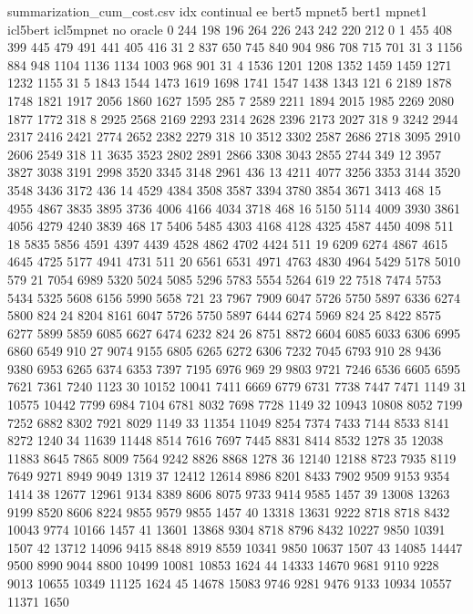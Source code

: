 

\begin{filecontents*}{summarization_cum_cost.csv}
idx	continual	ee	bert5	mpnet5	bert1	mpnet1	icl5bert	icl5mpnet	no	oracle
0	244	198	196	264	226	243	242	220	212	0
1	455	408	399	445	479	491	441	405	416	31
2	837	650	745	840	904	986	708	715	701	31
3	1156	884	948	1104	1136	1134	1003	968	901	31
4	1536	1201	1208	1352	1459	1459	1271	1232	1155	31
5	1843	1544	1473	1619	1698	1741	1547	1438	1343	121
6	2189	1878	1748	1821	1917	2056	1860	1627	1595	285
7	2589	2211	1894	2015	1985	2269	2080	1877	1772	318
8	2925	2568	2169	2293	2314	2628	2396	2173	2027	318
9	3242	2944	2317	2416	2421	2774	2652	2382	2279	318
10	3512	3302	2587	2686	2718	3095	2910	2606	2549	318
11	3635	3523	2802	2891	2866	3308	3043	2855	2744	349
12	3957	3827	3038	3191	2998	3520	3345	3148	2961	436
13	4211	4077	3256	3353	3144	3520	3548	3436	3172	436
14	4529	4384	3508	3587	3394	3780	3854	3671	3413	468
15	4955	4867	3835	3895	3736	4006	4166	4034	3718	468
16	5150	5114	4009	3930	3861	4056	4279	4240	3839	468
17	5406	5485	4303	4168	4128	4325	4587	4450	4098	511
18	5835	5856	4591	4397	4439	4528	4862	4702	4424	511
19	6209	6274	4867	4615	4645	4725	5177	4941	4731	511
20	6561	6531	4971	4763	4830	4964	5429	5178	5010	579
21	7054	6989	5320	5024	5085	5296	5783	5554	5264	619
22	7518	7474	5753	5434	5325	5608	6156	5990	5658	721
23	7967	7909	6047	5726	5750	5897	6336	6274	5800	824
24	8204	8161	6047	5726	5750	5897	6444	6274	5969	824
25	8422	8575	6277	5899	5859	6085	6627	6474	6232	824
26	8751	8872	6604	6085	6033	6306	6995	6860	6549	910
27	9074	9155	6805	6265	6272	6306	7232	7045	6793	910
28	9436	9380	6953	6265	6374	6353	7397	7195	6976	969
29	9803	9721	7246	6536	6605	6595	7621	7361	7240	1123
30	10152	10041	7411	6669	6779	6731	7738	7447	7471	1149
31	10575	10442	7799	6984	7104	6781	8032	7698	7728	1149
32	10943	10808	8052	7199	7252	6882	8302	7921	8029	1149
33	11354	11049	8254	7374	7433	7144	8533	8141	8272	1240
34	11639	11448	8514	7616	7697	7445	8831	8414	8532	1278
35	12038	11883	8645	7865	8009	7564	9242	8826	8868	1278
36	12140	12188	8723	7935	8119	7649	9271	8949	9049	1319
37	12412	12614	8986	8201	8433	7902	9509	9153	9354	1414
38	12677	12961	9134	8389	8606	8075	9733	9414	9585	1457
39	13008	13263	9199	8520	8606	8224	9855	9579	9855	1457
40	13318	13631	9222	8718	8718	8432	10043	9774	10166	1457
41	13601	13868	9304	8718	8796	8432	10227	9850	10391	1507
42	13712	14096	9415	8848	8919	8559	10341	9850	10637	1507
43	14085	14447	9500	8990	9044	8800	10499	10081	10853	1624
44	14333	14670	9681	9110	9228	9013	10655	10349	11125	1624
45	14678	15083	9746	9281	9476	9133	10934	10557	11371	1650

\end{filecontents*}
